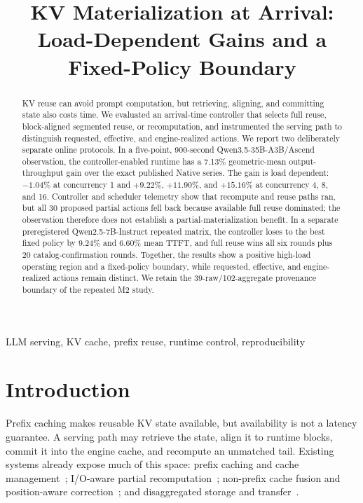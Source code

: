 \documentclass[conference]{IEEEtran}
\title{KV Materialization at Arrival: Load-Dependent Gains and a Fixed-Policy Boundary}
\author{\IEEEauthorblockN{Anonymous Artifact Draft}}
\begin{document}
\maketitle
\begin{abstract}
KV reuse can avoid prompt computation, but retrieving, aligning, and committing
state also costs time. We evaluated an arrival-time controller that selects full
reuse, block-aligned segmented reuse, or recomputation, and instrumented the
serving path to distinguish requested, effective, and engine-realized actions.
We report two deliberately separate online protocols. In a five-point,
900-second Qwen3.5-35B-A3B/Ascend observation, the controller-enabled runtime
has a 7.13\% geometric-mean output-throughput gain over the exact published
Native series. The gain is load dependent: $-1.04\%$ at concurrency 1 and
$+9.22\%$, $+11.90\%$, and $+15.16\%$ at concurrency 4, 8, and 16. Controller
and scheduler telemetry show that recompute and reuse paths ran, but all 30
proposed partial actions fell back because available full reuse dominated; the
observation therefore does not establish a partial-materialization benefit. In
a separate preregistered Qwen2.5-7B-Instruct repeated matrix, the controller
loses to the best fixed policy by 9.24\% and 6.60\% mean TTFT, and full reuse
wins all six rounds plus 20 catalog-confirmation rounds. Together, the results
show a positive high-load operating region and a fixed-policy boundary, while
requested, effective, and engine-realized actions remain distinct. We retain
the 39-raw/102-aggregate provenance boundary of the repeated M2 study.
\end{abstract}
\begin{IEEEkeywords}
LLM serving, KV cache, prefix reuse, runtime control, reproducibility
\end{IEEEkeywords}
\section{Introduction}
Prefix caching makes reusable KV state available, but availability is not a
latency guarantee. A serving path may retrieve the state, align it to runtime
blocks, commit it into the engine cache, and recompute an unmatched tail.
Existing systems already expose much of this space: prefix caching and cache
management~\cite{vllm2023,lmcache}; I/O-aware partial
recomputation~\cite{kvpr2025,ellm2026}; non-prefix cache fusion and
position-aware correction~\cite{cacheblend2025,cacheslide2026}; and
disaggregated storage and transfer~\cite{distserve2024,mooncake2025}.
\end{document}
